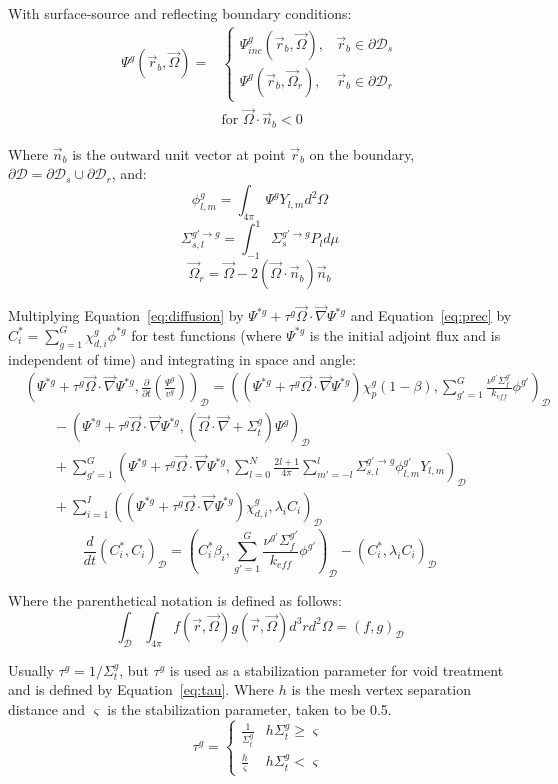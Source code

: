 \documentclass[11pt]{tamurmemo}
\newcommand{\grad}{\vec{\nabla}}
\newcommand{\be}{\begin{equation}}
\newcommand{\ee}{\end{equation}}
\newcommand{\kef}{\ensuremath{k_{\textit{eff}}}}
\newcommand{\keff}{\kef\xspace}
\newcommand{\vo}{\vec{\Omega}}
\newcommand{\vr}{\vec{r}}
\newcommand{\vn}{\vec{n}}
\newcommand{\qq}{\quad\quad}
\newcommand{\D}{\ensuremath{\mathcal{D}}}
\begin{document}
With surface-source and reflecting boundary conditions:
\begin{align}
\Psi^g(\vr_b,\vo) = & \begin{cases} \Psi_{inc}^g(\vr_b,\vo), & \vr_b\in\partial\D_s \\  \Psi^g(\vr_b,\vo_r), & \vr_b\in\partial\D_r \end{cases} \\
 & \text{for } \vo\cdot\vn_b<0
\end{align}

Where $\vn_b$ is the outward unit vector at point $\vr_b$ on the boundary, $\partial\D=\partial\D_s \cup \partial\D_r$, and:
\be
\phi^g_{l,m} = \int_{4\pi}\Psi^gY_{l,m}d^2\Omega
\ee
\be
\Sigma_{s,l}^{g'\to g} = \int_{-1}^1 \Sigma_{s}^{g'\to g} P_l d\mu
\ee
\be
\vo_r = \vo -2(\vo\cdot\vn_b)\vn_b
\ee

Multiplying Equation~\ref{eq:diffusion} by $\Psi^{*g}+\tau^g\vo\cdot\grad\Psi^{*g}$ and Equation~\ref{eq:prec} by $C_i^*=\sum_{g=1}^G\chi_{d,i}^g\phi^{*g}$ for test functions (where $\Psi^{*g}$ is the initial adjoint flux and is independent of time) and integrating in space and angle:
\begin{align}
&\left(\Psi^{*g}+\tau^g\vo\cdot\grad\Psi^{*g},\frac{\partial}{\partial t}\left(\frac{\Psi^g}{v^g}\right)\right)_\D = \left(\left(\Psi^{*g}+\tau^g\vo\cdot\grad\Psi^{*g}\right)\chi_p^g(1-\beta),\sum_{g'=1}^G \frac{\nu^{g'} \Sigma_f^{g'}}{\keff} \phi^{g'}\right)_\D \nonumber \\
& \qq - \left(\Psi^{*g}+\tau^g\vo\cdot\grad \Psi^{*g}, \left(\vo\cdot\grad + \Sigma_t^g\right) \Psi^g\right)_\D \nonumber \\
& \qq + \sum_{g'=1}^G\left(\Psi^{*g}+\tau^g\vo\cdot\grad\Psi^{*g},\sum_{l=0}^N \frac{2l+1}{4\pi}\sum_{m'=-l}^l\Sigma_{s,l}^{g'\to g} \phi^{g'}_{l,m}Y_{l,m}\right)_\D \nonumber \\
& \qq + \sum_{i=1}^I \left(\left(\Psi^{*g}+\tau^g\vo\cdot\grad\Psi^{*g}\right)\chi_{d,i}^g,\lambda_i C_i\right)_\D
\label{eq:tranweak}
\end{align}
\be
\frac{d}{dt}\left(C_i^*,C_i\right)_\D = \left(C_i^* \beta_i,\sum_{g'=1}^G\frac{\nu^{g'} \Sigma_f^{g'}}{\keff}\phi^{g'}\right)_\D -\left(C_i^*,\lambda_i C_i\right)_\D
\ee

Where the parenthetical notation is defined as follows:
\be
\int_\D\int_{4\pi} f(\vr,\vo) g(\vr,\vo) d^3r d^2\Omega = (f,g)_\D
\ee

Usually $\tau^g=1/\Sigma_t^g$, but $\tau^g$ is used as a stabilization parameter for void treatment and is defined by Equation~\ref{eq:tau}.  Where $h$ is the mesh vertex separation distance and $\varsigma$ is the stabilization parameter, taken to be 0.5.
\be
\tau^g = \begin{cases} \frac{1}{\Sigma_t^g} & h\Sigma_t^g\geq\varsigma \\ \frac{h}{\varsigma} & h\Sigma_t^g<\varsigma \end{cases}
\label{eq:tau}
\ee
\end{document}
